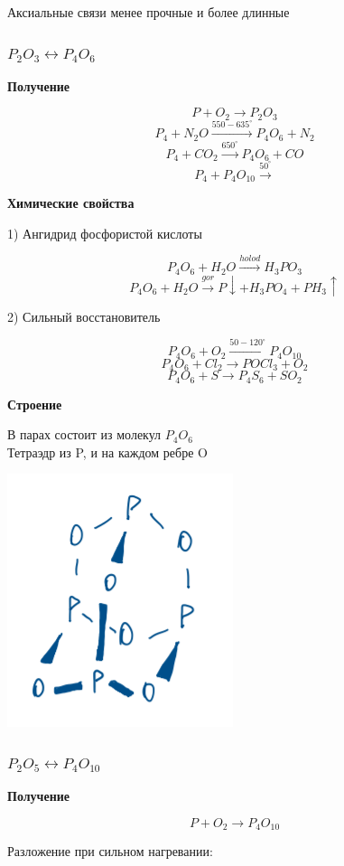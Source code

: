 \documentclass[14pt,a4paper]{scrartcl}
\begin{document}
Аксиальные связи менее прочные и более длинные

\subsubsection{$P_2O_3 \leftrightarrow P_4O_6$}

\textbf{Получение}

$$P + O_2 \rightarrow P_2O_3$$
$$P_4 + N_2O \xrightarrow{550-635^{\circ}} P_4O_6 + N_2$$
$$P_4 + CO_2 \xrightarrow{650^{\circ}} P_4O_6 + CO$$
$$P_4 + P_4O_{10} \xrightarrow{50^{\circ}}$$

\textbf{Химические свойства}

1) Ангидрид фосфористой кислоты

$$P_4O_6 + H_2O \xrightarrow{holod} H_3PO_3$$
$$P_4O_6 + H_2O \xrightarrow{gor} P\downarrow + H_3PO_4 + PH_3\uparrow$$

2) Сильный восстановитель

$$P_4O_6 + O_2 \xrightarrow{50-120^{\circ}} P_4O_10$$
$$P_4O_6 + Cl_2  \rightarrow POCl_3 + O_2$$
$$P_4O_6 + S \rightarrow P_4S_6 + SO_2$$

\textbf{Строение}

В парах состоит из молекул $P_4O_6$\\
Тетраэдр из P, и на каждом ребре O

\includegraphics{9v5.png}

\subsubsection{$P_2O_5 \leftrightarrow P_4O_{10}$}

\textbf{Получение}

$$ P + O_2 \rightarrow P_4O_{10}$$

Разложение при сильном нагревании:
\end{document}
